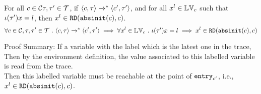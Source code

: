 %
\begin{lem}
\label{lem:inv_live}
For all $c \in \mathcal{C} \mathtt{\tau}, \mathtt{\tau}' \in \mathcal{T} $, if 
$\langle c, \mathtt{\tau} \rangle \xrightarrow{}^* \langle c', \mathtt{\tau}' \rangle$,
and for all $x^l \in \mathbb{LV}_c$ such that 
$\iota(\mathtt{\tau}') x = l $, then $x^l \in \mathtt{RD}(\mathtt{abs}{\mathtt{init}}(c), c)$.
%
\[
	\forall c \in \mathcal{C} , \mathtt{\tau}, \mathtt{\tau}' \in \mathcal{T} ~.~ 
	\langle c, \mathtt{\tau} \rangle \xrightarrow{}^* \langle c', \mathtt{\tau}' \rangle
	\implies
	\forall x^l \in \mathbb{LV}_c ~.~  \iota(\mathtt{\tau}') x = l \implies x^l \in \mathtt{RD}(\mathtt{abs}{\mathtt{init}}(c), c)
\]
\end{lem}
Proof Summary: 
If a variable with the label which is the latest one in the trace,
Then by the environment definition, the value associated to this labelled variable is read from the trace.
\\
Then this labelled variable must be reachable at the point of $\mathtt{entry}_{c'}$, i.e., 
$x^l \in \mathtt{RD}(\mathtt{abs}{\mathtt{init}}(c), c)$.
